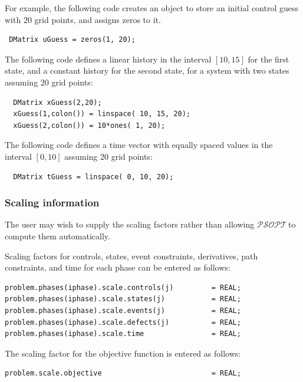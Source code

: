 \documentclass[a4paper,11pt]{report}    %
\newcommand{\psopt}{$\mathcal{PSOPT}$\,}  %
\newenvironment{shadedframe}{%
  \def\FrameCommand{\fcolorbox{black}{shadecolor}}%
  \MakeFramed {\FrameRestore}}
{\endMakeFramed}
\begin{document}
\begin{shadedframe}

 For example,
the following code creates an object to store an initial control guess with 20
grid points, and assigns zeros to it.

\begin{verbatim}
 DMatrix uGuess = zeros(1, 20);
\end{verbatim}

The following code defines a linear history in the interval $[10, 15]$ for the first state, and a constant
history for the second state, for a system with
two states assuming 20 grid points:

\begin{verbatim}
  DMatrix xGuess(2,20);
  xGuess(1,colon()) = linspace( 10, 15, 20);
  xGuess(2,colon()) = 10*ones( 1, 20);
\end{verbatim}

The following code defines a time vector with equally spaced
values in the interval $[0, 10]$ assuming 20 grid points:
\begin{verbatim}
  DMatrix tGuess = linspace( 0, 10, 20);
\end{verbatim}

\end{shadedframe}


\subsubsection{Scaling information}

The user may wish to supply the scaling factors rather than allowing \psopt to
compute them automatically.

Scaling factors for controls, states, event constraints, derivatives,
path constraints, and time for each phase can be  entered as follows:

\begin{verbatim}
problem.phases(iphase).scale.controls(j)         = REAL;
problem.phases(iphase).scale.states(j)           = REAL;
problem.phases(iphase).scale.events(j)           = REAL;
problem.phases(iphase).scale.defects(j)          = REAL;
problem.phases(iphase).scale.time                = REAL; 
\end{verbatim}

The scaling factor for the objective function is entered as follows:

\begin{verbatim}
problem.scale.objective                          = REAL;
\end{verbatim}
\end{document}
